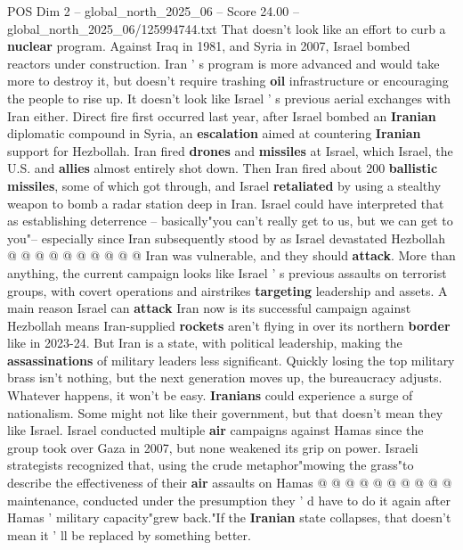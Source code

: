 \begin{textsample}{POS Dim 2 – global\_north\_2025\_06 – Score 24.00 – global\_north\_2025\_06/125994744.txt}  \label{ex:f2_pos_354}
That doesn't look like an effort to curb a \textbf{nuclear} program.
Against Iraq in 1981, and Syria in 2007, Israel bombed reactors under construction.
Iran ' s program is more advanced and would take more to destroy it, but doesn't require trashing \textbf{oil} infrastructure or encouraging the people to rise up.
It doesn't look like Israel ' s previous aerial exchanges with Iran either.
Direct fire first occurred last year, after Israel bombed an \textbf{Iranian} diplomatic compound in Syria, an \textbf{escalation} aimed at countering \textbf{Iranian} support for Hezbollah.
Iran fired \textbf{drones} and \textbf{missiles} at Israel, which Israel, the U.S. and \textbf{allies} almost entirely shot down.
Then Iran fired about 200 \textbf{ballistic} \textbf{missiles}, some of which got through, and Israel \textbf{retaliated} by using a stealthy weapon to bomb a radar station deep in Iran.
Israel could have interpreted that as establishing deterrence -- basically"you can't really get to us, but we can get to you"-- especially since Iran subsequently stood by as Israel devastated Hezbollah @ @ @ @ @ @ @ @ @ @ Iran was vulnerable, and they should \textbf{attack}.
More than anything, the current campaign looks like Israel ' s previous assaults on terrorist groups, with covert operations and airstrikes \textbf{targeting} leadership and assets.
A main reason Israel can \textbf{attack} Iran now is its successful campaign against Hezbollah means Iran-supplied \textbf{rockets} aren't flying in over its northern \textbf{border} like in 2023-24.
But Iran is a state, with political leadership, making the \textbf{assassinations} of military leaders less significant.
Quickly losing the top military brass isn't nothing, but the next generation moves up, the bureaucracy adjusts.
Whatever happens, it won't be easy. \textbf{Iranians} could experience a surge of nationalism.
Some might not like their government, but that doesn't mean they like Israel.
Israel conducted multiple \textbf{air} campaigns against Hamas since the group took over Gaza in 2007, but none weakened its grip on power.
Israeli strategists recognized that, using the crude metaphor"mowing the grass"to describe the effectiveness of their \textbf{air} assaults on Hamas @ @ @ @ @ @ @ @ @ @ maintenance, conducted under the presumption they ' d have to do it again after Hamas ' military capacity"grew back."If the \textbf{Iranian} state collapses, that doesn't mean it ' ll be replaced by something better.

\end{textsample}
